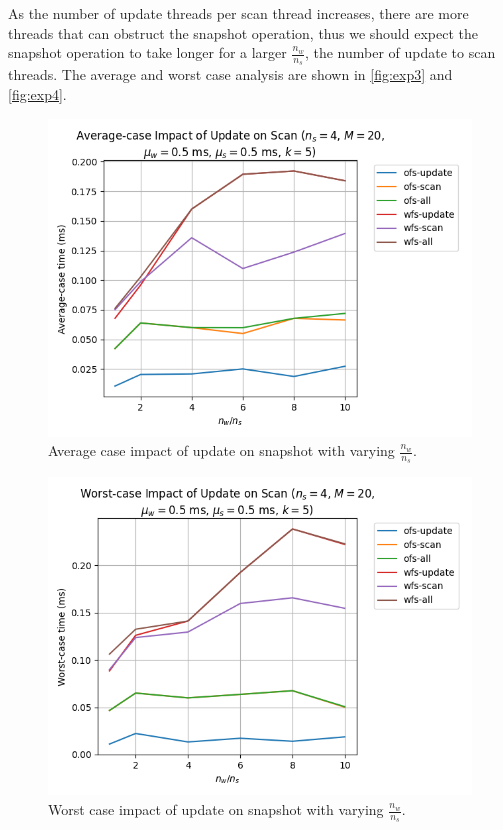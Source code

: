 \documentclass[conference,compsoc]{IEEEtran}
\begin{document}
As the number of update threads per scan thread increases, there are more
threads that can obstruct the snapshot operation, thus we should expect the
snapshot operation to take longer for a larger \(\frac{n_w}{n_s}\), the number
of update to scan threads. The average and worst case analysis are shown in
\autoref{fig:exp3} and \autoref{fig:exp4}.

\begin{figure}[!ht]
    \centering
    \includegraphics[width=\columnwidth]{images/exp3.png} 
    \caption{Average case impact of update on snapshot with varying \(\frac{n_w}{n_s}\).}
    \label{fig:exp3}
\end{figure}

\begin{figure}[!ht]
    \centering
    \includegraphics[width=\columnwidth]{images/exp4.png} 
    \caption{Worst case impact of update on snapshot with varying \(\frac{n_w}{n_s}\).}
    \label{fig:exp4}
\end{figure}
\end{document}
